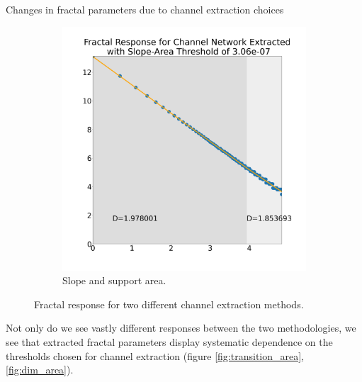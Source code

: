 \documentclass[final]{beamer}
\newlength{\colwidth}
\begin{document}
\begin{frame}[t]
\begin{columns}[t]
\begin{column}{\colwidth}
\begin{block}{Changes in fractal parameters due to channel extraction choices}
\begin{figure}[ht]
\begin{subfigure}{.45\textwidth}
      \centering
      \includegraphics[width=\textwidth]{slopearea_fractal.png}
      \caption{Slope and support area.}
      \label{fig:slopearea_fractal}
  \end{subfigure}
 \caption{Fractal response for two different channel extraction methods.}
    \end{figure}
  \end{block}

  Not only do we see vastly different responses between the two methodologies, we see that extracted fractal parameters display systematic dependence on the thresholds chosen for channel extraction (figure \ref{fig:transition_area}, \ref{fig:dim_area}).


\end{column}
\end{columns}
\end{frame}
\end{document}
